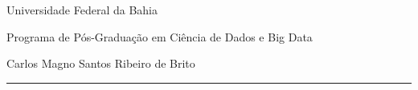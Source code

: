 \noindent Universidade Federal da Bahia

\noindent Programa de Pós-Graduação em Ciência de Dados e Big Data

\noindent Carlos Magno Santos Ribeiro de Brito

\noindent \rule{\linewidth}{1.5pt}